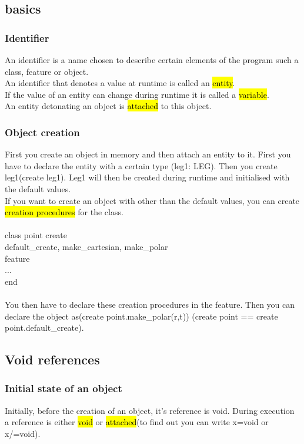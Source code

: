 \documentclass[11pt]{article}
\newcommand\tab[1][1cm]{\hspace*{#1}}
\begin{document}
\subsection{basics}
\subsubsection{Identifier}
An identifier is a name chosen to describe certain elements of the program such a class, feature or object.\\ An identifier that denotes a value at runtime is called an \hl{entity}.\\ If the value of an entity can change during runtime it is called a \hl{variable}.\\ An entity detonating an object is \hl{attached} to this object. 
\subsubsection{Object creation}
First you create an object in memory and then attach an entity to it. First you have to declare the entity with a certain type (leg1: LEG). Then you create leg1(create leg1). Leg1 will then be created during runtime and initialised with the default values.\\ If you want to create an object with other than the default values, you can create \hl{creation procedures} for the class.\\\\class point create\\\tab default\_create, make\_cartesian, make\_polar\\feature\\\tab...\\end\\\\ You then have to declare these creation procedures in the feature. Then you can declare the object as(create point.make\_polar(r,t)) (create point == create point.default\_create).
\subsection{Void references}
\subsubsection{Initial state of an object}
Initially, before the creation of an object, it's reference is void. During execution a reference is either \hl{void} or \hl{attached}(to find out you can write x=void or x/=void).
\end{document}
